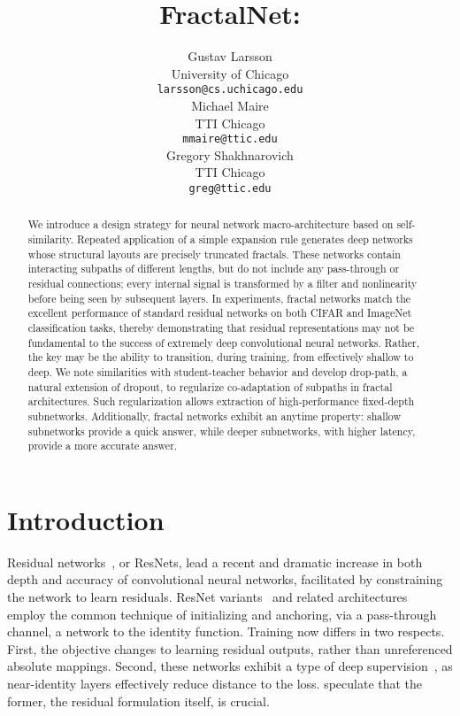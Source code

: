 \documentclass{article}
\title{FractalNet:\\\resizebox{\textwidth}{!}{Ultra-Deep Neural Networks without Residuals}}
\author{Gustav Larsson\\
   University of Chicago\\
   \texttt{larsson@cs.uchicago.edu}\\
   \And
   Michael Maire\\
   TTI Chicago\\
   \texttt{mmaire@ttic.edu}\\
   \And
   Gregory Shakhnarovich\\
   TTI Chicago\\
   \texttt{greg@ttic.edu}}
\newcommand{\resnets}{ResNets}
\newcommand{\Resnet}{ResNet}
\begin{document}
\maketitle

\begin{abstract}
We introduce a design strategy for neural network macro-architecture based on
self-similarity.  Repeated application of a simple expansion rule generates
deep networks whose structural layouts are precisely truncated fractals.  These
networks contain interacting subpaths of different lengths, but do not include
any pass-through or residual connections; every internal signal is transformed
by a filter and nonlinearity before being seen by subsequent layers.  In
experiments, fractal networks match the excellent performance of standard
residual networks on both CIFAR and ImageNet classification tasks, thereby
demonstrating that residual representations may not be fundamental to the
success of extremely deep convolutional neural networks.  Rather, the key may
be the ability to transition, during training, from effectively shallow to
deep.  We note similarities with student-teacher behavior and develop
drop-path, a natural extension of dropout, to regularize co-adaptation of
subpaths in fractal architectures.  Such regularization allows extraction of
high-performance fixed-depth subnetworks.  Additionally, fractal networks
exhibit an anytime property: shallow subnetworks provide a quick answer, while
deeper subnetworks, with higher latency, provide a more accurate answer.
 \end{abstract}

\section{Introduction}
\label{sec:intro}
Residual networks~\citep{he2015deep}, or {\resnets}, lead a recent and dramatic
increase in both depth and accuracy of convolutional neural networks,
facilitated by constraining the network to learn residuals.  {\Resnet}
variants~\citep{he2015deep,he2016identity,huang2016stochasticdepth} and related
architectures~\citep{srivastava2015highway} employ the common technique of
initializing and anchoring, via a pass-through channel, a network to the
identity function.  Training now differs in two respects.  First, the objective
changes to learning residual outputs, rather than unreferenced absolute
mappings.  Second, these networks exhibit a type of deep supervision~\citep{
lee2014deeply}, as near-identity layers effectively reduce distance to the
loss.  \cite{he2015deep} speculate that the former, the residual formulation
itself, is crucial.
\end{document}
